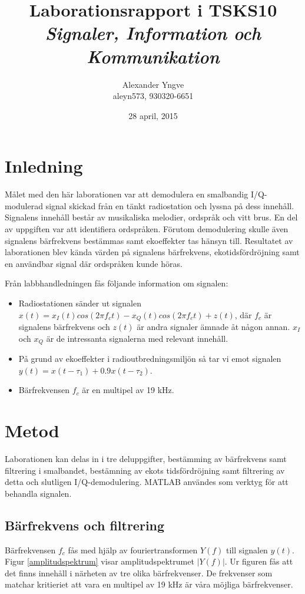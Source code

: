 \documentclass[10pt]{article}
\title{Laborationsrapport i TSKS10 \emph{Signaler, Information och Kommunikation}}
\author{Alexander Yngve\\aleyn573, 930320-6651}
\date{28 april, 2015}
\begin{document}
\maketitle

\clearpage

\begin{multicols}{2}
\section{Inledning} \label{inledning}

Målet med den här laborationen var att demodulera en smalbandig I/Q-modulerad signal skickad från en tänkt radiostation och lyssna på dess innehåll. Signalens innehåll består av musikaliska melodier, ordspråk och vitt brus. En del av uppgiften var att identifiera ordspråken. Förutom demodulering skulle även signalens bärfrekvens bestämmas samt ekoeffekter tas hänsyn till. Resultatet av laborationen blev kända värden på signalens bärfrekvens, ekotidsfördröjning samt en användbar signal där ordspråken kunde höras.

Från labbhandledningen fås följande information om signalen:

\begin{itemize}
\item Radiostationen sänder ut signalen $x(t) = x_I(t)cos(2\pi f_ct) - x_Q(t)cos(2\pi f_ct) + z(t)$, där $f_c$ är signalens bärfrekvens och $z(t)$ är andra signaler ämnade åt någon annan. $x_I$ och $x_Q$ är de intressanta signalerna med relevant innehåll.
\item På grund av ekoeffekter i radioutbredningsmiljön så tar vi emot signalen $y(t) = x(t - \tau_1) + 0.9x(t - \tau_2)$. 
\item Bärfrekvensen $f_c$ är en multipel av 19 kHz.
\end{itemize}

\section{Metod}

Laborationen kan delas in i tre deluppgifter, bestämming av bärfrekvens samt filtrering i smalbandet, bestämning av ekots tidsfördröjning samt filtrering av detta och slutligen I/Q-demodulering. MATLAB användes som verktyg för att behandla signalen.

\subsection{Bärfrekvens och filtrering}
Bärfrekvensen $f_c$ fås med hjälp av fouriertransformen $Y(f)$ till signalen $y(t)$. Figur \ref{amplitudspektrum} visar amplitudspektrumet $|Y(f)|$. Ur figuren fås att det finns innehåll i närheten av tre olika bärfrekvenser. De frekvenser som matchar kritieriet att vara en multipel av 19 kHz är våra möjliga bärfrekvenser.


\end{multicols}
\end{document}
